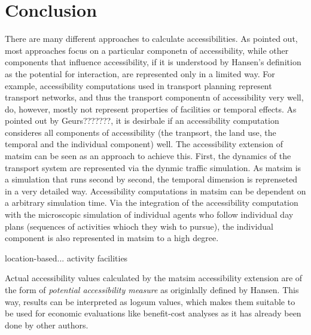 \section{Conclusion}
There are many different approaches to calculate accessibilities. As pointed out, most approaches focus on a particular 
componetn of accessibility, while other components that influence accessibility, if it is understood by Hansen's definition 
as the potential for interaction, are represented only in a limited way. For example, accessibility computations used in 
transport planning represent transport networks, and thus the transport componentn of accessibility very well, do, however, 
mostly not represent properties of facilities or temporal effects. As pointed out by Geurs???????, it is desirbale if an 
accessibility computation consideres all components of accessibility (the tranpsort, the land use, the temporal and the 
individual component) well. The accessibility extension of \gls{matsim} can be seen as an approach to achieve this. First, 
the dynamics of the transport system are represented via the dynmic traffic simulation. As \gls{matsim} is a simulation 
that runs second by second, the temporal dimension is reprenseted in a very detailed way. Accessibility computations in 
\gls{matsim} can be dependent on a arbitrary simulation time. Via the integration of the accessibility computation with 
the microscopic simulation of individual agents who follow individual day plans (sequences of activities whioch they 
wish to pursue), the individual component is also represented in \gls{matsim} to a high degree.

location-based... activity facilities

Actual accessibility values calculated by the \gls{matsim} accessibility extension are of the form of \textit{potential 
	accessibility measure} as originlally defined by Hansen. This way, results can be interpreted as logsum values, 
which makes them suitable to be used for economic evaluations like benefit-cost analyses as it has already been done 
by other authors.




